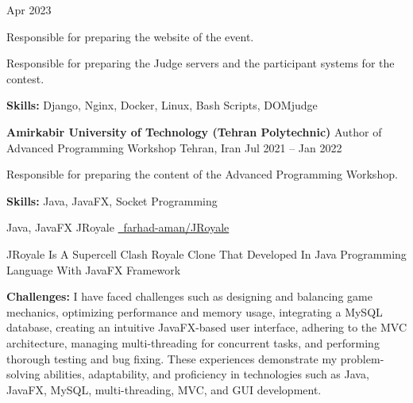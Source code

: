 \documentclass[]{awesome-cv}
\begin{document}
\begin{cventries}
	{Apr 2023}
	{\begin{cvitems}
		\vspace{1mm}
        \item{Responsible for preparing the website of the event.}
        \vspace{1mm}
		\item{Responsible for preparing the Judge servers and the participant systems for the contest.}
        \vspace{1mm}
        \item{\textbf{Skills: }Django, Nginx, Docker, Linux, Bash Scripts, DOMjudge}
	\end{cvitems}}
	\cventry
	{\textbf{Amirkabir University of Technology (Tehran Polytechnic)}}
	{Author of Advanced Programming Workshop}
	{Tehran, Iran}
	{Jul 2021 – Jan 2022}
	{\begin{cvitems}
		\vspace{1mm}
		\item{Responsible for preparing the content of the Advanced Programming Workshop.}
        \vspace{1mm}
        \item{\textbf{Skills: }Java, JavaFX, Socket Programming}
	\end{cvitems}}
\end{cventries}
\begin{cventries}
	\cventry
	{Java, JavaFX}
	{JRoyale}
	{}
	{\href{https://github.com/farhad-aman/JRoyale}{\faGithub\ farhad-aman/JRoyale}}
	{\begin{cvitems}
		\vspace{1mm}
		\item{JRoyale Is A Supercell Clash Royale Clone That Developed In Java Programming Language With JavaFX Framework }
        \vspace{1mm}
        \item{\textbf{Challenges: }I have faced challenges such as designing and balancing game mechanics, optimizing performance and memory usage, integrating a MySQL database, creating an intuitive JavaFX-based user interface, adhering to the MVC architecture, managing multi-threading for concurrent tasks, and performing thorough testing and bug fixing. These experiences demonstrate my problem-solving abilities, adaptability, and proficiency in technologies such as Java, JavaFX, MySQL, multi-threading, MVC, and GUI development.}
	\end{cvitems}}
	\vspace{0mm}
\end{cventries}
\end{document}
